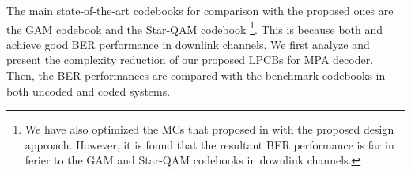 \documentclass[journal]{IEEEtran}
\begin{document}
The main  state-of-the-art  codebooks for comparison with the proposed ones are the GAM codebook \cite{mheich2018design}  and the Star-QAM codebook \cite{yu2015optimized}\footnote{We have also optimized the MCs  that proposed  in \cite{bao2017bit} with the proposed design approach. However, it is found that the resultant BER performance is far in ferier to the GAM and Star-QAM codebooks in downlink channels. }. 
 This is because  both  \cite{mheich2018design} and \cite{yu2015optimized}   achieve  good BER performance in downlink channels. %
 We first analyze  and present the complexity reduction of our  proposed LPCBs for MPA decoder. Then, the BER performances  are  compared with  the benchmark codebooks in both uncoded and coded systems. %
\end{document}
